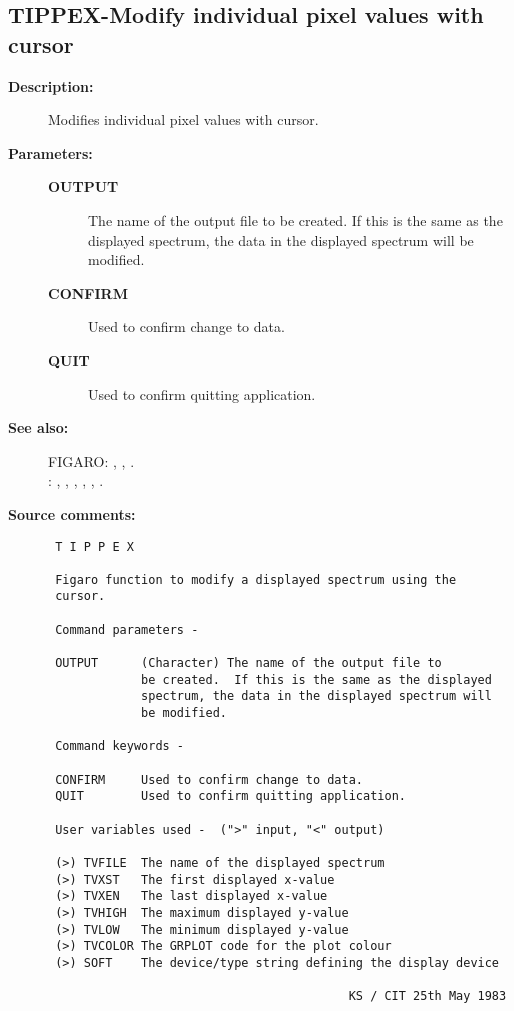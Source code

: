 \subsection{TIPPEX-\label{TIPPEX}Modify individual pixel values with cursor}
\begin{description}

\item [{\bf Description:}]
 Modifies individual pixel values with cursor.

\item [{\bf Parameters:}]
\begin{description}
\item [{\bf OUTPUT}]
 The name of the output file to be created.  If this is the same as
 the displayed spectrum, the data in the displayed spectrum will be
 modified.
\item [{\bf CONFIRM}]
 Used to confirm change to data.
\item [{\bf QUIT}]
 Used to confirm quitting application.
\end{description}

\item [{\bf See also:}]
FIGARO: , , .\\
: , , , , , .\\

\item [{\bf Source comments:}]
\begin{verbatim}
 T I P P E X

 Figaro function to modify a displayed spectrum using the
 cursor.

 Command parameters -

 OUTPUT      (Character) The name of the output file to
             be created.  If this is the same as the displayed
             spectrum, the data in the displayed spectrum will
             be modified.

 Command keywords -

 CONFIRM     Used to confirm change to data.
 QUIT        Used to confirm quitting application.

 User variables used -  (">" input, "<" output)

 (>) TVFILE  The name of the displayed spectrum
 (>) TVXST   The first displayed x-value
 (>) TVXEN   The last displayed x-value
 (>) TVHIGH  The maximum displayed y-value
 (>) TVLOW   The minimum displayed y-value
 (>) TVCOLOR The GRPLOT code for the plot colour
 (>) SOFT    The device/type string defining the display device

                                          KS / CIT 25th May 1983
\end{verbatim}
\end{description}
